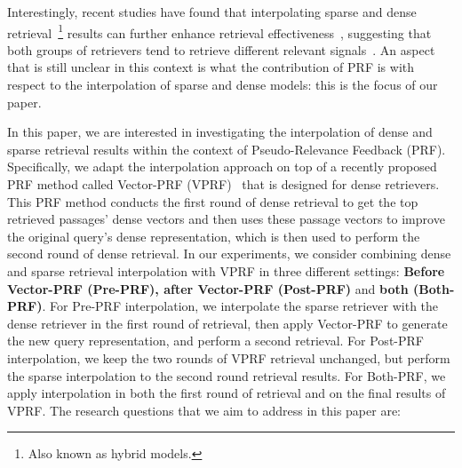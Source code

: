Interestingly, recent studies have found that interpolating sparse and dense retrieval~\footnote{Also known as hybrid models.} results can further enhance retrieval effectiveness~\cite{wang2021bert,lin2020distilling,lin2021few}, suggesting that both groups of retrievers tend to retrieve different relevant signals~\cite{lin2021few,lin2020pretrained}. An aspect that is still unclear in this context is what the contribution of PRF is with respect to the interpolation of sparse and dense models: this is the focus of our paper.

In this paper, we are interested in investigating the interpolation of dense and sparse retrieval results within the context of Pseudo-Relevance Feedback (PRF). Specifically, we adapt the interpolation approach on top of a recently proposed PRF method called Vector-PRF (VPRF)~\cite{li2021pseudo} that is designed for dense retrievers. This PRF method conducts the first round of dense retrieval to get the top retrieved passages' dense vectors and then uses these passage vectors to improve the original query's dense representation, which is then used to perform the second round of dense retrieval. In our experiments, we consider combining dense and sparse retrieval interpolation with VPRF in three different settings: \textbf{Before Vector-PRF (Pre-PRF), after Vector-PRF (Post-PRF)} and \textbf{both (Both-PRF)}. For Pre-PRF interpolation, we interpolate the sparse retriever with the dense retriever in the first round of retrieval, then apply Vector-PRF to generate the new query representation, and perform a second retrieval. For Post-PRF interpolation, we keep the two rounds of VPRF retrieval unchanged,  but perform the sparse interpolation to the second round retrieval results. For Both-PRF, we apply interpolation in both the first round of retrieval and on the final results of VPRF. The research questions that we aim to address in this paper are:


